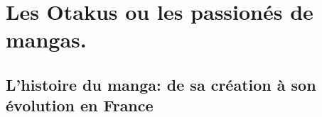 \part{Les Otakus ou les passionés de mangas.}
\chapter{L'histoire du manga: de sa création à son évolution en France}

